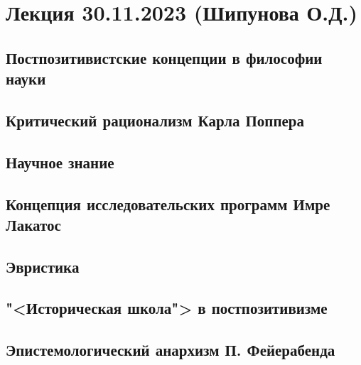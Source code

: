 \documentclass[main.tex]{subfiles}
\begin{document}
\section{Лекция 30.11.2023 (Шипунова О.Д.)}


\subsection{Постпозитивистские концепции в философии науки}


\subsection{Критический рационализм Карла Поппера}




\subsection{Научное знание}


\subsection{Концепция исследовательских программ Имре Лакатос}


\subsection{Эвристика}


\subsection{"<Историческая школа"> в постпозитивизме}




\subsection{Эпистемологический анархизм П. Фейерабенда}
\end{document}
